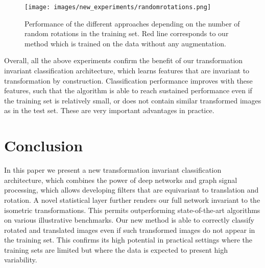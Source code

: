 \documentclass[10pt,journal,compsoc]{IEEEtran}
\begin{document}
	\begin{figure}[t!]
		\texttt{[image: images/new\_experiments/randomrotations.png]}
		\caption{Performance of the different approaches depending on the number of random rotations in the training set. Red line corresponds to our method which is trained on the data without any augmentation.}
		\label{fig:randomrot}
	\end{figure}


	Overall, all the above experiments confirm the benefit of our transformation invariant classification architecture, which learns features that are invariant to transformation by construction. Classification performance improves with these features, such that the algorithm is able to reach sustained performance even if the training set is relatively small, or does not contain similar transformed images as in the test set. These are very important advantages in practice.


	\section{Conclusion}
	\label{s:conclusion}

	In this paper we present a new transformation invariant classification architecture, which combines the power of deep networks and graph signal processing, which allows developing filters that are equivariant to translation and rotation. A novel statistical layer further renders our full network invariant to the isometric transformations. This permits outperforming state-of-the-art algorithms on various illustrative benchmarks. Our new method is able to correctly classify rotated and translated images even if such transformed images do not appear in the training set. This confirms its high potential in practical settings where the training sets are limited but where the data is expected to present high variability.
















	
	
\end{document}
